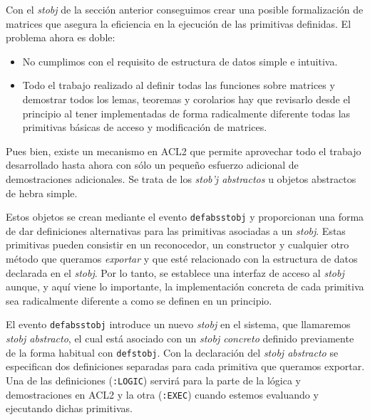 \documentclass[a4paper,10pt]{article}
\begin{document}
Con el \emph{stobj} de la sección anterior conseguimos crear una posible formalización de matrices que asegura la eficiencia en la ejecución de las primitivas definidas. El problema ahora es doble:

\par \vspace{10pt}

\begin{itemize}
	\item No cumplimos con el requisito de estructura de datos simple e intuitiva. 
	\item Todo el trabajo realizado al definir todas las funciones sobre matrices y demostrar todos los lemas, teoremas y corolarios hay que revisarlo desde el principio al tener implementadas de forma radicalmente diferente todas las primitivas básicas de acceso y modificación de matrices.
\end{itemize}

\par \vspace{10pt}

Pues bien, existe un mecanismo en ACL2 que permite aprovechar todo el trabajo desarrollado hasta ahora con sólo un pequeño esfuerzo adicional de demostraciones adicionales. Se trata de los \emph{stob'j abstractos} u objetos abstractos de hebra simple.

\par \vspace{10pt}

Estos objetos se crean mediante el evento \texttt{defabsstobj} y proporcionan una forma de dar definiciones alternativas para las primitivas asociadas a un \emph{stobj}. Estas primitivas pueden consistir en un reconocedor, un constructor y cualquier otro método que queramos \emph{exportar} y que esté relacionado con la estructura de datos declarada en el \emph{stobj}. Por lo tanto, se establece una interfaz de acceso al \emph{stobj} aunque, y aquí viene lo importante, la implementación concreta de cada primitiva sea radicalmente diferente a como se definen en un principio.

\par \vspace{10pt}

El evento \texttt{defabsstobj} introduce un nuevo \emph{stobj} en el sistema, que llamaremos \emph{stobj abstracto}, el cual está asociado con un \emph{stobj concreto} definido previamente de la forma habitual con \texttt{defstobj}. Con la declaración del \emph{stobj abstracto} se especifican dos definiciones separadas para cada primitiva que queramos exportar. Una de las definiciones (\texttt{:LOGIC}) servirá para la parte de la lógica y demostraciones en ACL2 y la otra (\texttt{:EXEC}) cuando estemos evaluando y ejecutando dichas primitivas.
\end{document}
